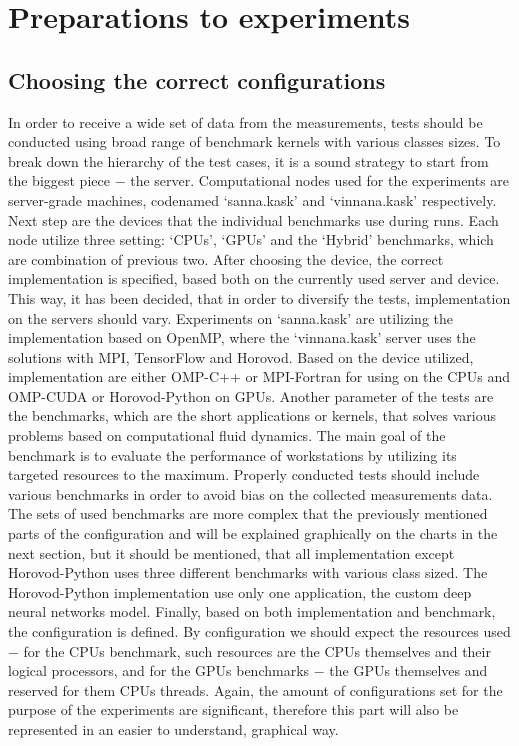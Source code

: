\chapter{Preparations to experiments}

\section{Choosing the correct configurations}

In order to receive a wide set of data from the measurements, tests should be
conducted using broad range of benchmark kernels with various classes sizes.
To break down the hierarchy of the test cases, it is a sound strategy to start
from the biggest piece $-$ the server. Computational nodes used for the 
experiments are server-grade machines, codenamed `sanna.kask' and
`vinnana.kask' respectively. Next step are the devices that the individual
benchmarks use during runs. Each node utilize three setting: `CPUs', `GPUs'
and the `Hybrid' benchmarks, which are combination of previous two. After
choosing the device, the correct implementation is specified, based both on
the currently used server and device. This way, it has been decided, that in
order to diversify the tests, implementation on the servers should vary.
Experiments on `sanna.kask' are utilizing the implementation based on OpenMP,
where the `vinnana.kask' server uses the solutions with MPI, TensorFlow and
Horovod. Based on the device utilized, implementation are either OMP-C++ or
MPI-Fortran for using on the CPUs and OMP-CUDA or Horovod-Python on GPUs.
Another parameter of the tests are the benchmarks, which are the short
applications or kernels, that solves various problems based on computational
fluid dynamics. The main goal of the benchmark is to evaluate the performance
of workstations by utilizing its targeted resources to the maximum. Properly
conducted tests should include various benchmarks in order to avoid bias on
the collected measurements data. The sets of used benchmarks are more complex
that the previously mentioned parts of the configuration and will be explained
graphically on the charts in the next section, but it should be mentioned, that
all implementation except Horovod-Python uses three different benchmarks with
various class sized. The Horovod-Python implementation use only one
application, the custom deep neural networks model. Finally, based on both
implementation and benchmark, the configuration is defined. By configuration
we should expect the resources used $-$ for the CPUs benchmark, such resources
are the CPUs themselves and their logical processors, and for the GPUs 
benchmarks $-$ the GPUs themselves and reserved for them CPUs threads. Again,
the amount of configurations set for the purpose of the experiments are
significant, therefore this part will also be represented in an easier to
understand, graphical way.

